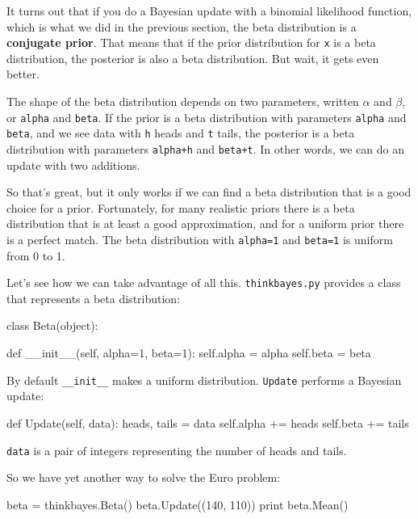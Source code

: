 \documentclass[12pt]{book}
\theoremstyle{exercise}
\begin{document}

It turns out that if you do a Bayesian update with a binomial
likelihood function, which is what we did in the previous section, the beta
distribution is a {\bf conjugate prior}.  That means that if the prior
distribution for {\tt x} is a beta distribution, the posterior is also
a beta distribution.  But wait, it gets even better.

The shape of the beta distribution depends on two parameters, written
$\alpha$ and $\beta$, or {\tt alpha} and {\tt beta}.  If the prior
is a beta distribution with parameters {\tt alpha} and {\tt beta}, and
we see data with {\tt h} heads and {\tt t} tails, the posterior is a
beta distribution with parameters {\tt alpha+h} and {\tt beta+t}.  In
other words, we can do an update with two additions.

So that's great, but it only works if we can find a beta distribution
that is a good choice for a prior.  Fortunately, for many realistic
priors there is a beta distribution that is at least a good
approximation, and for a uniform prior there is a perfect match.  The
beta distribution with {\tt alpha=1} and {\tt beta=1} is uniform from
0 to 1.

Let's see how we can take advantage of all this.  
{\tt thinkbayes.py} provides 
a class that represents a beta distribution:

\begin{code}
class Beta(object):

    def __init__(self, alpha=1, beta=1):
        self.alpha = alpha
        self.beta = beta
\end{code}

By default \verb"__init__" makes a uniform distribution.
{\tt Update} performs a Bayesian update:

\begin{code}
    def Update(self, data):
        heads, tails = data
        self.alpha += heads
        self.beta += tails
\end{code}

{\tt data} is a pair of integers representing the number of
heads and tails.

So we have yet another way to solve the Euro problem:

\begin{code}
    beta = thinkbayes.Beta()
    beta.Update((140, 110))
    print beta.Mean()
\end{code}
\end{document}
